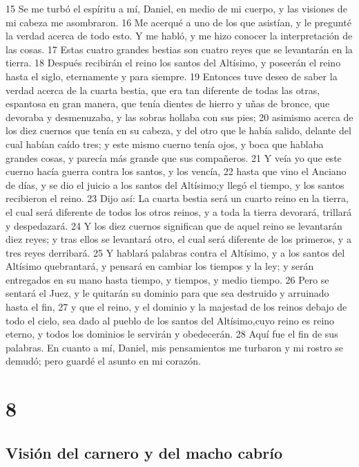 15 Se me turbó el espíritu a mí, Daniel, en medio de mi cuerpo, y las visiones de mi cabeza me asombraron.
16 Me acerqué a uno de los que asistían, y le pregunté la verdad acerca de todo esto. Y me habló, y me hizo conocer la interpretación de las cosas.
17 Estas cuatro grandes bestias son cuatro reyes que se levantarán en la tierra.
18 Después recibirán el reino los santos del Altísimo, y poseerán el reino hasta el siglo, eternamente y para siempre. 
19 Entonces tuve deseo de saber la verdad acerca de la cuarta bestia, que era tan diferente de todas las otras, espantosa en gran manera, que tenía dientes de hierro y uñas de bronce, que devoraba y desmenuzaba, y las sobras hollaba con sus pies;
20 asimismo acerca de los diez cuernos que tenía en su cabeza, y del otro que le había salido, delante del cual habían caído tres; y este mismo cuerno tenía ojos, y boca que hablaba grandes cosas, y parecía más grande que sus compañeros.
21 Y veía yo que este cuerno hacía guerra contra los santos, y los vencía, 
22 hasta que vino el Anciano de días, y se dio el juicio a los santos del Altísimo;y llegó el tiempo, y los santos recibieron el reino.
23 Dijo así: La cuarta bestia será un cuarto reino en la tierra, el cual será diferente de todos los otros reinos, y a toda la tierra devorará, trillará y despedazará.
24 Y los diez cuernos significan que de aquel reino se levantarán diez reyes; y tras ellos se levantará otro, el cual será diferente de los primeros, y a tres reyes derribará.
25 Y hablará palabras contra el Altísimo, y a los santos del Altísimo quebrantará, y pensará en cambiar los tiempos y la ley; y serán entregados en su mano hasta tiempo, y tiempos, y medio tiempo. 
26 Pero se sentará el Juez, y le quitarán su dominio para que sea destruido y arruinado hasta el fin,
27 y que el reino, y el dominio y la majestad de los reinos debajo de todo el cielo, sea dado al pueblo de los santos del Altísimo,cuyo reino es reino eterno, y todos los dominios le servirán y obedecerán.
28 Aquí fue el fin de sus palabras. En cuanto a mí, Daniel, mis pensamientos me turbaron y mi rostro se demudó; pero guardé el asunto en mi corazón.

\chapter{8}

\section*{Visión del carnero y del macho cabrío}

